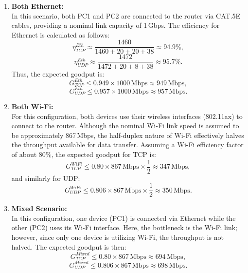         \begin{enumerate}
            \item \textbf{Both Ethernet:} \\
            In this scenario, both PC1 and PC2 are connected to the router via CAT.5E cables, providing a nominal link capacity of 1\,Gbps. 
            The efficiency for Ethernet is calculated as follows:
            \[
            \eta_{TCP}^{Eth} \approx \frac{1460}{1460 + 20 + 20 + 38} \approx 94.9\%,
            \]
            \[
            \eta_{UDP}^{Eth} \approx \frac{1472}{1472 + 20 + 8 + 38} \approx 95.7\%.
            \]
            Thus, the expected goodput is:
            \[
            G_{TCP}^{Eth} \leq 0.949 \times 1000\,\text{Mbps} \approx 949\,\text{Mbps},
            \]
            \[
            G_{UDP}^{Eth} \leq 0.957 \times 1000\,\text{Mbps} \approx 957\,\text{Mbps}.
            \]

            \vspace{0.2cm} %

            \item \textbf{Both Wi-Fi:} \\
            For this configuration, both devices use their wireless interfaces (802.11ax) to connect to the router. 
            Although the nominal Wi-Fi link speed is assumed to be approximately 867\,Mbps, the half-duplex nature of Wi-Fi effectively halves the throughput available for data transfer. 
            Assuming a Wi-Fi efficiency factor of about 80\%, the expected goodput for TCP is:
            \[
            G_{TCP}^{WiFi} \leq 0.80 \times 867\,\text{Mbps} \times \frac{1}{2} \approx 347\,\text{Mbps},
            \]
            and similarly for UDP:
            \[
            G_{UDP}^{WiFi} \leq 0.806 \times 867\,\text{Mbps} \times \frac{1}{2} \approx 350\,\text{Mbps}.
            \]


            \item \textbf{Mixed Scenario:} \\
            In this configuration, one device (PC1) is connected via Ethernet while the other (PC2) uses its Wi-Fi interface. 
            Here, the bottleneck is the Wi-Fi link; however, since only one device is utilizing Wi-Fi, the throughput is not halved. 
            The expected goodput is then:
            \[
            G_{TCP}^{Mixed} \leq 0.80 \times 867\,\text{Mbps} \approx 694\,\text{Mbps},
            \]
            \[
            G_{UDP}^{Mixed} \leq 0.806 \times 867\,\text{Mbps} \approx 698\,\text{Mbps}.
            \]
        \end{enumerate}

